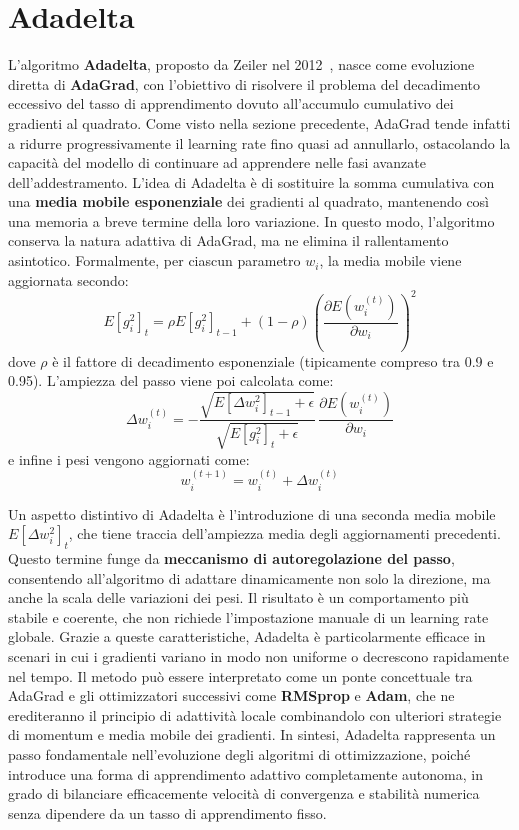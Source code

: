\section{Adadelta}

L’algoritmo \textbf{Adadelta}, proposto da Zeiler nel 2012~\cite{Zeiler2012AdaDelta}, nasce come evoluzione diretta di \textbf{AdaGrad}, con l’obiettivo di risolvere il problema del decadimento eccessivo del tasso di apprendimento dovuto all’accumulo cumulativo dei gradienti al quadrato. Come visto nella sezione precedente, AdaGrad tende infatti a ridurre progressivamente il learning rate fino quasi ad annullarlo, ostacolando la capacità del modello di continuare ad apprendere nelle fasi avanzate dell’addestramento. L’idea di Adadelta è di sostituire la somma cumulativa con una \textbf{media mobile esponenziale} dei gradienti al quadrato, mantenendo così una memoria a breve termine della loro variazione. In questo modo, l’algoritmo conserva la natura adattiva di AdaGrad, ma ne elimina il rallentamento asintotico. Formalmente, per ciascun parametro $w_i$, la media mobile viene aggiornata secondo:
\[
E[g_i^2]_t = \rho E[g_i^2]_{t-1} + (1 - \rho) \left( \frac{\partial E(w_i^{(t)})}{\partial w_i} \right)^2
\]
dove $\rho$ è il fattore di decadimento esponenziale (tipicamente compreso tra 0.9 e 0.95). L’ampiezza del passo viene poi calcolata come:
\[
\Delta w_i^{(t)} = - \frac{\sqrt{E[\Delta w_i^2]_{t-1} + \epsilon}}{\sqrt{E[g_i^2]_t + \epsilon}} \, \frac{\partial E(w_i^{(t)})}{\partial w_i}
\]
e infine i pesi vengono aggiornati come:
\[
w_i^{(t+1)} = w_i^{(t)} + \Delta w_i^{(t)}
\]

Un aspetto distintivo di Adadelta è l’introduzione di una seconda media mobile $E[\Delta w_i^2]_t$, che tiene traccia dell’ampiezza media degli aggiornamenti precedenti. Questo termine funge da \textbf{meccanismo di autoregolazione del passo}, consentendo all’algoritmo di adattare dinamicamente non solo la direzione, ma anche la scala delle variazioni dei pesi. Il risultato è un comportamento più stabile e coerente, che non richiede l’impostazione manuale di un learning rate globale. Grazie a queste caratteristiche, Adadelta è particolarmente efficace in scenari in cui i gradienti variano in modo non uniforme o decrescono rapidamente nel tempo. Il metodo può essere interpretato come un ponte concettuale tra AdaGrad e gli ottimizzatori successivi come \textbf{RMSprop} e \textbf{Adam}, che ne erediteranno il principio di adattività locale combinandolo con ulteriori strategie di momentum e media mobile dei gradienti. In sintesi, Adadelta rappresenta un passo fondamentale nell’evoluzione degli algoritmi di ottimizzazione, poiché introduce una forma di apprendimento adattivo completamente autonoma, in grado di bilanciare efficacemente velocità di convergenza e stabilità numerica senza dipendere da un tasso di apprendimento fisso.

